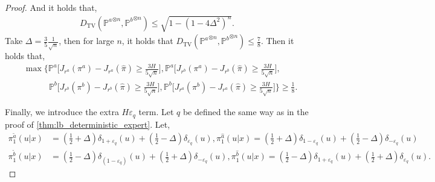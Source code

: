 \documentclass{article}
\begin{document}
\begin{proof}
And it holds that,
\begin{align*}
    D_\text{TV}({\mathbb P^{a}}^{\otimes n},{\mathbb P^{b}}^{\otimes n})\leq \sqrt {1-(1-4\Delta^2)^n}.
\end{align*}
Take $\Delta=\frac{3}{5}\frac{1}{\sqrt n}$, then for large $n$, it holds that $D_\text{TV}({\mathbb P^{a}}^{\otimes n},{\mathbb P^{b}}^{\otimes n})\leq \frac78$. Then it holds that,
\begin{align*}
    &\max\Big\{
\mathbb P^{a}\big[J_{r^{a}}(\pi^{a})-J_{r^{a}}(\hat\pi)\ge \frac{3H}{5\sqrt n}\big],
\mathbb P^{a}\big[J_{r^{b}}(\pi^{a})-J_{r^{b}}(\hat\pi)\ge \frac{3H}{5\sqrt n}\big],\\
&\qquad\quad
\mathbb P^{b}\big[J_{r^{b}}(\pi^{b})-J_{r^{b}}(\hat\pi)\ge \frac{3H}{5\sqrt n}\big],
\mathbb P^{b}\big[J_{r^{a}}(\pi^{b})-J_{r^{a}}(\hat\pi)\ge \frac{3H}{5\sqrt n}\big]
\Big\}\geq \frac{1}{8}.
\end{align*}

Finally, we introduce the extra $H\varepsilon_q$ term. Let $q$ be defined the same way as in the proof of \cref{thm:lb_deterministic_expert}.   Let,
\begin{align*}
    \pi^{\tilde a}_1(u|x)&=(\frac12+\Delta)\delta_{1+\varepsilon_q}(u)+(\frac{1}{2}-\Delta)\delta_{\varepsilon_q}(u), \pi^{\hat a}_1(u|x)=(\frac12+\Delta)\delta_{1-\varepsilon_q}(u)+(\frac{1}{2}-\Delta)\delta_{-\varepsilon_q}(u)\\
    \pi^{\tilde b}_1(u|x)&=(\frac12-\Delta)\delta_{(1-\varepsilon_q)}(u)+(\frac{1}{2}+\Delta)\delta_{-\varepsilon_q}(u), \pi_1^{\hat b}(u|x)=(\frac12-\Delta)\delta_{1+\varepsilon_q}(u)+(\frac{1}{2}+\Delta)\delta_{\varepsilon_q}(u).
\end{align*}


\end{proof}
\end{document}
